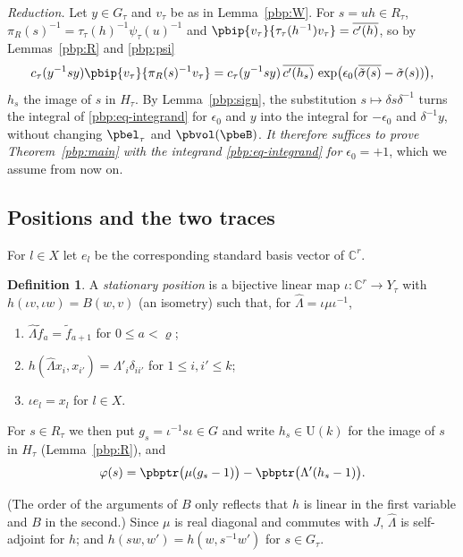 \documentclass[10pt]{amsart}
\theoremstyle{definition}
\newtheorem{definition}[theorem]{Definition}
\theoremstyle{remark}
\newcommand{\C}{\mathbb C}
\providecommand{\auU}{\mathrm U}
\providecommand{\aubar}[1]{\overline{#1}}
\begin{document}
\emph{Reduction.} Let $y\in G_\tau$ and $v_\tau$ be as in Lemma~\ref{pbp:W}. For $s=uh\in R_\tau$,
$\pi_R(s)^{-1}=\tau_\tau(h)^{-1}\psi_\tau(u)^{-1}$ and $\pbip{v_\tau}{\tau_\tau(h^{-1})v_\tau}=
\aubar{c'(h)}$, so by Lemmas~\ref{pbp:R} and \ref{pbp:psi}
\begin{equation}\label{pbp:eq-integrand}
c_\tau(y^{-1}sy)\pbip{v_\tau}{\pi_R(s)^{-1}v_\tau}=c_\tau(y^{-1}sy)\,\aubar{c'(h_s)}\,
\exp\bigl(\epsilon_0(\aubar{\tilde\sigma(s)}-\tilde\sigma(s))\bigr),
\end{equation}
$h_s$ the image of $s$ in $H_\tau$. By Lemma~\ref{pbp:sign}, the substitution $s\mapsto\delta s
\delta^{-1}$ turns the integral of \eqref{pbp:eq-integrand} for $\epsilon_0$ and $y$ into the integral
for $-\epsilon_0$ and $\delta^{-1}y$, without changing $\pbel_\tau$ and $\pbvol(\pbeB)$. \emph{It
therefore suffices to prove Theorem~\ref{pbp:main} with the integrand
\eqref{pbp:eq-integrand} for $\epsilon_0=+1$}, which we assume from now on.

\subsection{Positions and the two traces}\label{pbp:ss-pos}

For $l\in X$ let $e_l$ be the corresponding standard basis vector of $\C^r$.

\begin{definition}\label{pbp:def-pos}
A \emph{stationary position} is a bijective linear map $\iota\colon\C^r\to Y_\tau$ with
$h(\iota v,\iota w)=B(w,v)$ \textup(an isometry\textup) such that, for $\widehat\Lambda=\iota\mu
\iota^{-1}$,
\begin{enumerate}
\item[(S1)] $\widehat\Lambda\tilde f_a=\tilde f_{a+1}$ for $0\le a<\varrho$;
\item[(S2)] $h(\widehat\Lambda x_i,x_{i'})=\Lambda'_i\delta_{ii'}$ for $1\le i,i'\le k$;
\item[(S3)] $\iota e_l=x_l$ for $l\in X$.
\end{enumerate}
For $s\in R_\tau$ we then put $g_s=\iota^{-1}s\iota\in G$ and write $h_s\in\auU(k)$ for the image of
$s$ in $H_\tau$ (Lemma~\ref{pbp:R}), and
\[
\varphi(s)=\pbptr\bigl(\mu(g_s-1)\bigr)-\pbptr\bigl(\Lambda'(h_s-1)\bigr).
\]
\end{definition}

(The order of the arguments of $B$ only reflects that $h$ is linear in the first variable and $B$ in
the second.) Since $\mu$ is real diagonal and commutes with $J$, $\widehat\Lambda$ is self-adjoint for
$h$; and $h(sw,w')=h(w,s^{-1}w')$ for $s\in G_\tau$.
\end{document}

